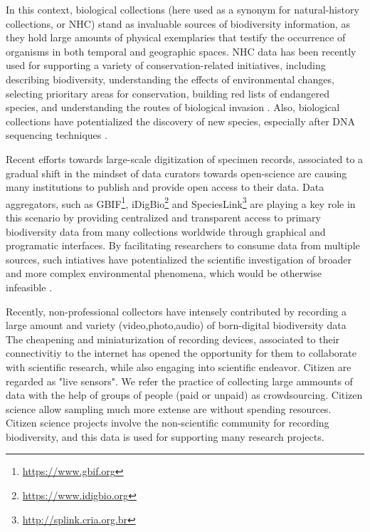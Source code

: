 In this context, biological collections (here used as a synonym for natural-history collections, or NHC) stand as invaluable sources of biodiversity information, as they hold large amounts of physical exemplaries that testify the occurrence of organisms in both temporal and geographic spaces.
NHC data has been recently used for supporting a variety of conservation-related initiatives, including describing biodiversity, understanding the effects of environmental changes, selecting prioritary areas for conservation, building red lists of endangered species, and understanding the routes of biological invasion \cite{Nualart2017, kemp2015}. %
Also, biological collections have potentialized the discovery of new species, especially after DNA sequencing techniques \cite{Kemp2015}.

Recent efforts towards large-scale digitization of specimen records, associated to a gradual shift in the mindset of data curators towards open-science are causing many institutions to publish and provide open access to their data.
Data aggregators, such as GBIF\footnote{\url{https://www.gbif.org}}, iDigBio\footnote{\url{https://www.idigbio.org}} and SpeciesLink\footnote{\url{http://splink.cria.org.br}} are playing a key role in this scenario by providing centralized and transparent access to primary biodiversity data from many collections worldwide through graphical and programatic interfaces.
By facilitating researchers to consume data from multiple sources, such intiatives have potentialized the scientific investigation of broader and more complex environmental phenomena, which would be otherwise infeasible \cite{James2018}.

Recently, non-professional collectors have intensely contributed by recording a large amount and variety (video,photo,audio) of born-digital biodiversity data
The cheapening and miniaturization of recording devices, associated to their connectivitiy to the internet has opened the opportunity for them to collaborate with scientific research, while also engaging into scientific endeavor.
Citizen are regarded as "live sensors".
We refer the practice of collecting large ammounts of data with the help of groups of people (paid or unpaid) as crowdsourcing.
Citizen science allow sampling much more extense are without spending resources.
Citizen science projects involve the non-scientific community for recording biodiversity, and this data is used for supporting many research projects.

